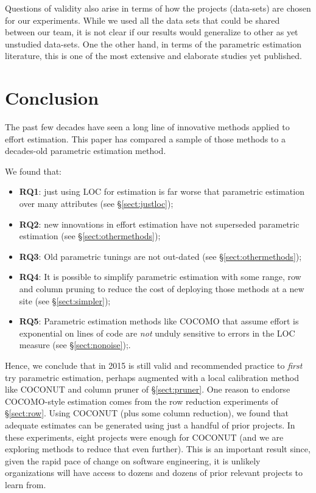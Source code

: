 \documentclass{sig-alternate}
\newcommand{\bi}{\begin{itemize}[leftmargin=0.4cm]}
\newcommand{\ei}{\end{itemize}}
\newcommand{\tion}[1]{\S\ref{sect:#1}}
\begin{document}
Questions of validity also arise in terms of how the
projects (data-sets) are chosen for our experiments.
While we used all the data sets that could be shared
between our team, it is not clear if our results
would generalize to other as yet unstudied
data-sets. One the other hand, in terms of the
parametric estimation literature, this is one of the most extensive
and elaborate studies yet published.
 
 
\section{Conclusion}
The past few decades have seen a long line of innovative  methods
applied to effort estimation. This paper has compared a sample of those methods
to a decades-old parametric estimation method. 

We found that:
\bi
\item {\bf RQ1}: just using LOC for estimation is far worse
that parametric estimation over many attributes (see \tion{justloc}); 
\item {\bf RQ2}: new innovations in effort estimation have not superseded parametric estimation (see \tion{othermethods});
\item {\bf RQ3}: Old parametric tunings are not out-dated (see \tion{othermethods});
\item {\bf RQ4}: It is possible to simplify parametric estimation with some range, row and column pruning to reduce the cost
of deploying those methods at a new site (see \tion{simpler});
\item {\bf RQ5}: Parametric estimation methods like COCOMO that assume effort is exponential on lines of code are {\em not} unduly
sensitive to errors in the LOC measure (see \tion{nonoise});.
\ei
Hence, we conclude that in 2015 is still valid and recommended practice to {\em first} try parametric estimation,
perhaps  augmented with a local calibration method like COCONUT
and   column pruner of \tion{pruner}. 
One   reason to endorse COCOMO-style estimation comes from the row reduction experiments of \tion{row}.
Using COCONUT (plus some column reduction), we found that adequate estimates can be generated using
just a handful of prior projects.
In these experiments, eight projects were enough for COCONUT (and we are exploring methods
to reduce that even further). This is an important result since, given the rapid pace of change
on software engineering, it is unlikely organizations will have access to dozens and dozens of prior
relevant projects to learn from.
\end{document}
